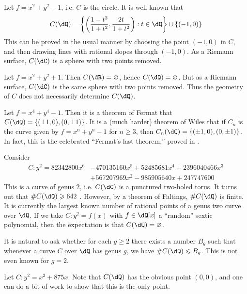 \documentclass{article}
\begin{document}
\begin{example}
Let $f=x^2+y^2-1$, i.e. $C$ is the circle. It is well-known that 
\[
  C(\dQ)=\left\{\left(\frac{1-t^2}{1+t^2},\frac{2t}{1+t^2}\right):t\in\dQ\right\}\cup \{(-1,0)\}
\]
This can be proved in the usual manner by choosing the point $(-1,0)$ in $C$, 
and then drawing lines with rational slopes through $(-1,0)$. As a Riemann 
surface, $C(\dC)$ is a sphere with two points removed. 
\end{example}

\begin{example}
Let $f=x^2+y^2+1$. Then $C(\dR)=\varnothing$, hence $C(\dQ)=\varnothing$. But 
as a Riemann surface, $C(\dC)$ is the same sphere with two points removed. Thus 
the geometry of $C$ does not necessarily determine $C(\dQ)$. 
\end{example}

\begin{example}
Let $f=x^4+y^4-1$. Then it is a theorem of Fermat that 
$C(\dQ)=\{(\pm 1,0),(0,\pm 1)\}$. It is a (much harder) theorem of Wiles that if 
$C_n$ is the curve given by $f=x^n+y^n-1$ for $n\geqslant 3$, then 
$C_n(\dQ)=\{(\pm 1,0),(0,\pm 1)\}$. In fact, this is the celebrated 
``Fermat's last theorem,'' proved in \cite{wi95}. 
\end{example}

\begin{example}[Stoll]
Consider 
\begin{align*}
  C : y^2 = 82342800 x^6 &- 470135160 x^5 + 52485681 x^4 + 2396040466 x^3 \\
    &+ 567207969 x^2 - 985905640 x + 247747600
\end{align*}
This is a curve of genus 2, i.e. $C(\dC)$ is a punctured two-holed 
torus. It turns out that $\# C(\dQ)\geqslant 642$ \cite[\S 6]{st09}. 
However, by a theorem of Faltings, $\# C(\dQ)$ is finite. It is 
currently the largest known number of rational points of a genus two curve 
over $\dQ$. If we take $C:y^2=f(x)$ with $f\in\dQ[x]$ a 
``random'' sextic polynomial, then the expectation is that 
$C(\dQ)=\varnothing$. 
\end{example}

It is natural to ask whether for each $g\geqslant 2$ there exists a number 
$B_g$ such that whenever a curve $C$ over $\dQ$ has genus $g$, we have 
$\# C(\dQ)\leqslant B_g$. This is not even known for $g=2$. 

\begin{example}
Let $C:y^2=x^3+875 x$. Note that $C(\dQ)$ has the obvious point 
$(0,0)$, and one can do a bit of work to show that this is the only point. 
\end{example}
\end{document}
